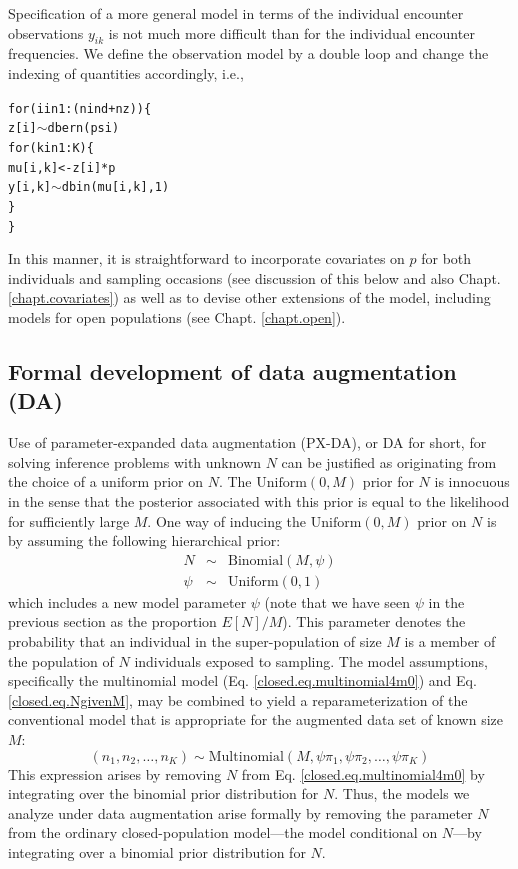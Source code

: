 Specification of a more general model in terms of the individual
encounter observations $y_{ik}$ is not much more difficult than for
the individual encounter frequencies.  We define the
observation model by a double loop and change the indexing of quantities
accordingly, i.e.,
{\small
\begin{alltt}
for(i in 1:(nind+nz))\{
    z[i]\( \sim \) dbern(psi)
  for(k in 1:K)\{
      mu[i,k]<-z[i]*p
      y[i,k]\( \sim \)dbin(mu[i,k],1)
  \}
\}
\end{alltt}
}
In this manner, it is straightforward to incorporate covariates on $p$
for both individuals and sampling occasions
(see discussion of this below and also Chapt. \ref{chapt.covariates})
as well as to devise other extensions of the model, including models
for open populations (see Chapt. \ref{chapt.open}).

\subsection{Formal development of data augmentation (DA) }

Use of parameter-expanded data augmentation (PX-DA), or DA for short, for solving inference problems with unknown $N$ can be
justified as originating from the choice of a uniform prior on $N$.  The
$\mathrm{Uniform}(0,M)$ prior for $N$ is innocuous in the sense that the
posterior associated with this prior is equal to the likelihood for
sufficiently large $M$.  One way of inducing the $\mathrm{Uniform}(0,M)$
prior on $N$ is by assuming the following hierarchical prior:
\begin{eqnarray}
\label{closed.eq.NgivenM}
  N &\sim& \mathrm{Binomial}(M, \psi) \\ \nonumber
  \psi &\sim& \mathrm{Uniform}(0,1)
\end{eqnarray}
which includes a new model parameter $\psi$
(note that we have seen $\psi$ in the previous section as the proportion $E[N]/M$).
This parameter denotes
the probability that an individual in the super-population of size $M$
is a member of the population of $N$ individuals exposed to sampling.
The model assumptions, specifically the multinomial model
(Eq. \ref{closed.eq.multinomial4m0})
and Eq. \ref{closed.eq.NgivenM}, may be combined to yield a
reparameterization of the conventional model that is appropriate for
the augmented data set of known size $M$:
\begin{equation}
\label{closed.eq.multinomial4DA}
    (n_1, n_2, \ldots, n_K) \sim \mathrm{Multinomial}(M, \psi  \pi_{1}, \psi \pi_{2}, \ldots, \psi \pi_{K})
\end{equation}
This expression arises by removing $N$ from Eq. \ref{closed.eq.multinomial4m0} by
integrating
over the binomial prior distribution for $N$. Thus, the models we
analyze under data augmentation arise formally by removing the
parameter $N$ from the ordinary closed-population model---the model
conditional on $N$---by integrating over a binomial prior distribution
for $N$.

